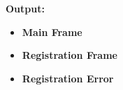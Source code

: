 \documentclass{book}
\begin{document}
{\begin{enumerate}
\begin{itemize}
            \textbf{Output:}
            \begin{itemize} 
                \item { \textbf{Main Frame}
                }
                \item{ \textbf{Registration Frame}
                }
                \item{ \textbf{Registration Error}
}
\end{itemize}
\end{itemize}
\end{enumerate}}
\end{document}

